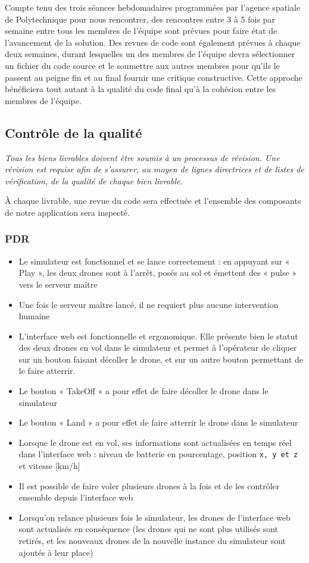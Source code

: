 \documentclass{mistcoursedoc}
\begin{document}
Compte tenu des trois séances hebdomadaires programmées par l’agence spatiale de Polytechnique pour nous rencontrer, des rencontres entre 3 à 5 fois par semaine entre tous les membres de l’équipe sont prévues pour faire état de l'avancement de la solution. Des revues de code sont également prévues à chaque deux semaines, durant lesquelles un des membres de l'équipe devra sélectionner un fichier du code source et le soumettre aux autres membres pour qu'ils le passent au peigne fin et au final fournir une critique constructive. Cette approche bénéficiera tout autant à la qualité du code final qu'à la cohésion entre les membres de l'équipe.

\subsection{Contrôle de la qualité}

\textit{Tous les biens livrables doivent être soumis à un processus de révision. Une révision est requise afin de s’assurer, au moyen de lignes directrices et de listes de vérification, de la qualité de chaque bien livrable.}

À chaque livrable, une revue du code sera effectuée et l'ensemble des composants de notre application sera inspecté.
\subsubsection{PDR}
\begin{itemize}
  \item Le simulateur est fonctionnel et se lance correctement : en appuyant sur « Play », les deux drones sont à l'arrêt, posés au sol et émettent des « pulse » vers le serveur maître
  \item Une fois le serveur maître lancé, il ne requiert plus aucune intervention humaine
  \item L'interface web est fonctionnelle et ergonomique. Elle présente bien le statut des deux drones en vol dans le simulateur et permet à l'opérateur de cliquer sur un bouton faisant décoller le drone, et sur un autre bouton permettant de le faire atterrir.
  \item Le bouton « TakeOff » a pour effet de faire décoller le drone dans le simulateur
  \item Le bouton « Land » a pour effet de faire atterrir le drone dans le simulateur
  \item Lorsque le drone est en vol, ses informations sont actualisées en temps réel dans l'interface web : niveau de batterie en pourcentage, position \texttt{x, y et z} et vitesse [km/h]
  \item Il est possible de faire voler plusieurs drones à la fois et de les contrôler ensemble depuis l'interface web
  \item Lorsqu'on relance plusieurs fois le simulateur, les drones de l'interface web sont actualisés en conséquence (les drones qui ne sont plus utilisés sont retirés, et les nouveaux drones de la nouvelle instance du simulateur sont ajoutés à leur place)
\end{itemize}
\end{document}

